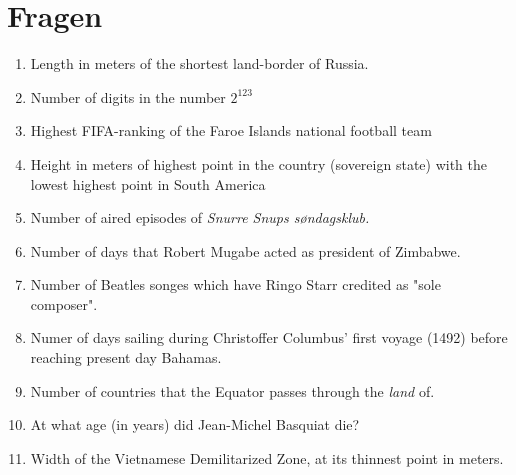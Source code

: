 \documentclass[12pt,a4paper]{article}
\begin{document}
\section*{Fragen}
\begin{enumerate}

\item Length in meters of the shortest land-border of Russia.

\item Number of digits in the number $2^{123}$

\item Highest FIFA-ranking of the Faroe Islands national football team



\item Height in meters of highest point in the country (sovereign state) with the lowest highest point in South America


\item Number of aired episodes of \textit{Snurre Snups søndagsklub.}
  
\item Number of days that Robert Mugabe acted as president of Zimbabwe.

\item Number of Beatles songes which have Ringo Starr credited as "sole composer".



\item Numer of days sailing during Christoffer Columbus' first voyage (1492) before reaching present day Bahamas.

\item Number of countries that the Equator passes through the \textit{land} of. 

\item At what age (in years) did Jean-Michel Basquiat die?

\item Width of the Vietnamese Demilitarized Zone, at its thinnest point in meters.
  
  
 

\end{enumerate}
\end{document}
